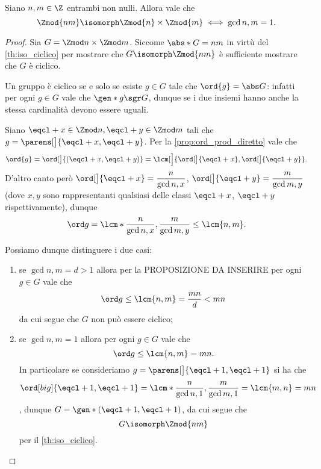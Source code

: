 \begin{theorem}
     \label{th:cinese_III}
    Siano $n, m \in \Z$ entrambi non nulli. Allora vale che \[
        \Zmod{nm} \isomorph \Zmod{n}\times \Zmod{m} \iff \gcd{n, m} = 1.
    \]
\end{theorem}
\begin{proof}
    Sia $G = \Zmod n \times \Zmod m$. Siccome $\abs*{G} = nm$ in virtù del \autoref{th:iso_ciclico} per mostrare che $G \isomorph \Zmod{nm}$ è sufficiente mostrare che $G$ è ciclico.

    Un gruppo è ciclico se e solo se esiste $g \in G$ tale che $\ord{g} = \abs G$: infatti per ogni $g \in G$ vale che $\gen*{g} \sgr G$, dunque se i due insiemi hanno anche la stessa cardinalità devono essere uguali.

    Siano $\eqcl+ x \in \Zmod n, \eqcl+ y \in \Zmod m$ tali che $g = \parens[\big]{\eqcl+ x, \eqcl+ y}$. Per la \autoref{prop:ord_prod_diretto} vale che \[
        \ord{g} = \ord[\big]{(\eqcl+ x, \eqcl+ y)} = \lcm[\Big]{\ord[\big]{\eqcl+ x}, \ord[\big]{\eqcl+ y}}.    
    \]
    D'altro canto però $\ord[\big]{\eqcl+ x} = \dfrac{n}{\gcd{n, x}}$, $\ord[\big]{\eqcl+ y} = \dfrac{m}{\gcd{m, y}}$ (dove $x, y$ sono rappresentanti qualsiasi delle classi $\eqcl+ x$, $\eqcl+ y$ rispettivamente), dunque \[
        \ord g = \lcm*{\dfrac{n}{\gcd{n, x}}, \dfrac{m}{\gcd{m, y}}} \leq \lcm{n, m}. 
    \]

    Possiamo dunque distinguere i due casi: \begin{enumerate}
        \item se $\gcd{n, m} = d > 1$ allora per la PROPOSIZIONE DA INSERIRE per ogni $g \in G$ vale che \[
            \ord g \leq \lcm{n, m} = \frac{mn}{d} < mn    
        \] da cui segue che $G$ non può essere ciclico;
        \item se $\gcd{n, m} = 1$ allora per ogni $g \in G$ vale che \[
            \ord g \leq \lcm{n, m} = mn.    
        \] In particolare se consideriamo $g = \parens[\big]{\eqcl+ 1, \eqcl+ 1}$ si ha che \[
            \ord[big]{\eqcl+ 1, \eqcl+ 1} = \lcm*{\frac{n}{\gcd{n, 1}}, \frac{m}{\gcd{m, 1}}} = \lcm{m, n} = mn  
        \], dunque $G = \gen*{(\eqcl+ 1, \eqcl+ 1)}$, da cui segue che \[
            G \isomorph \Zmod{nm}    
        \] per il \autoref{th:iso_ciclico}. \qedhere
    \end{enumerate} 
\end{proof}

